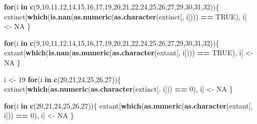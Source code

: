 \documentclass[]{book}
\newenvironment{Shaded}{\begin{snugshade}}{\end{snugshade}}
\newcommand{\KeywordTok}[1]{\textcolor[rgb]{0.13,0.29,0.53}{\textbf{{#1}}}}
\newcommand{\DecValTok}[1]{\textcolor[rgb]{0.00,0.00,0.81}{{#1}}}
\newcommand{\StringTok}[1]{\textcolor[rgb]{0.31,0.60,0.02}{{#1}}}
\newcommand{\OtherTok}[1]{\textcolor[rgb]{0.56,0.35,0.01}{{#1}}}
\newcommand{\ControlFlowTok}[1]{\textcolor[rgb]{0.13,0.29,0.53}{\textbf{{#1}}}}
\newcommand{\OperatorTok}[1]{\textcolor[rgb]{0.81,0.36,0.00}{\textbf{{#1}}}}
\newcommand{\NormalTok}[1]{{#1}}
\theoremstyle{definition}
\theoremstyle{definition}
\theoremstyle{remark}
\begin{document}
\begin{Shaded}
\begin{Highlighting}[]
\ControlFlowTok{for}\NormalTok{(i }\ControlFlowTok{in} \KeywordTok{c}\NormalTok{(}\DecValTok{9}\NormalTok{,}\DecValTok{10}\NormalTok{,}\DecValTok{11}\NormalTok{,}\DecValTok{12}\NormalTok{,}\DecValTok{14}\NormalTok{,}\DecValTok{15}\NormalTok{,}\DecValTok{16}\NormalTok{,}\DecValTok{17}\NormalTok{,}\DecValTok{19}\NormalTok{,}\DecValTok{20}\NormalTok{,}\DecValTok{21}\NormalTok{,}\DecValTok{22}\NormalTok{,}\DecValTok{24}\NormalTok{,}\DecValTok{25}\NormalTok{,}\DecValTok{26}\NormalTok{,}\DecValTok{27}\NormalTok{,}\DecValTok{29}\NormalTok{,}\DecValTok{30}\NormalTok{,}\DecValTok{31}\NormalTok{,}\DecValTok{32}\NormalTok{))\{}
\NormalTok{    extinct[}\KeywordTok{which}\NormalTok{(}\KeywordTok{is.nan}\NormalTok{(}\KeywordTok{as.numeric}\NormalTok{(}\KeywordTok{as.character}\NormalTok{(extinct[, i]))) }\OperatorTok{==}\StringTok{ }\OtherTok{TRUE}\NormalTok{), i] <-}\StringTok{ }\OtherTok{NA}
\NormalTok{\}}

\ControlFlowTok{for}\NormalTok{(i }\ControlFlowTok{in} \KeywordTok{c}\NormalTok{(}\DecValTok{9}\NormalTok{,}\DecValTok{10}\NormalTok{,}\DecValTok{11}\NormalTok{,}\DecValTok{12}\NormalTok{,}\DecValTok{14}\NormalTok{,}\DecValTok{15}\NormalTok{,}\DecValTok{16}\NormalTok{,}\DecValTok{17}\NormalTok{,}\DecValTok{19}\NormalTok{,}\DecValTok{20}\NormalTok{,}\DecValTok{21}\NormalTok{,}\DecValTok{22}\NormalTok{,}\DecValTok{24}\NormalTok{,}\DecValTok{25}\NormalTok{,}\DecValTok{26}\NormalTok{,}\DecValTok{27}\NormalTok{,}\DecValTok{29}\NormalTok{,}\DecValTok{30}\NormalTok{,}\DecValTok{31}\NormalTok{,}\DecValTok{32}\NormalTok{))\{}
\NormalTok{    extant[}\KeywordTok{which}\NormalTok{(}\KeywordTok{is.nan}\NormalTok{(}\KeywordTok{as.numeric}\NormalTok{(}\KeywordTok{as.character}\NormalTok{(extant[, i]))) }\OperatorTok{==}\StringTok{ }\OtherTok{TRUE}\NormalTok{), i] <-}\StringTok{ }\OtherTok{NA}
\NormalTok{\}}

\NormalTok{i <-}\StringTok{ }\DecValTok{19}
\ControlFlowTok{for}\NormalTok{(i }\ControlFlowTok{in} \KeywordTok{c}\NormalTok{(}\DecValTok{20}\NormalTok{,}\DecValTok{21}\NormalTok{,}\DecValTok{24}\NormalTok{,}\DecValTok{25}\NormalTok{,}\DecValTok{26}\NormalTok{,}\DecValTok{27}\NormalTok{))\{}
\NormalTok{    extinct[}\KeywordTok{which}\NormalTok{(}\KeywordTok{as.numeric}\NormalTok{(}\KeywordTok{as.character}\NormalTok{(extinct[, i])) }\OperatorTok{==}\StringTok{ }\DecValTok{0}\NormalTok{), i] <-}\StringTok{ }\OtherTok{NA}
\NormalTok{\}}

\ControlFlowTok{for}\NormalTok{(i }\ControlFlowTok{in} \KeywordTok{c}\NormalTok{(}\DecValTok{20}\NormalTok{,}\DecValTok{21}\NormalTok{,}\DecValTok{24}\NormalTok{,}\DecValTok{25}\NormalTok{,}\DecValTok{26}\NormalTok{,}\DecValTok{27}\NormalTok{))\{}
\NormalTok{    extant[}\KeywordTok{which}\NormalTok{(}\KeywordTok{as.numeric}\NormalTok{(}\KeywordTok{as.character}\NormalTok{(extant[, i])) }\OperatorTok{==}\StringTok{ }\DecValTok{0}\NormalTok{), i] <-}\StringTok{ }\OtherTok{NA}
\NormalTok{\}}



\end{Highlighting}
\end{Shaded}
\end{document}

